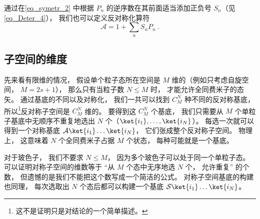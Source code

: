 通过在\autoref{eq_symetr_2} 中根据 $P_n$ 的逆序数在其前面适当添加正负号 $S_n$（见\autoref{eq_Deter_4}）， 我们也可以定义反对称化算符
\begin{equation}
\mathcal A = 1 + \sum_n S_n P_n~.
\end{equation}

\subsection{子空间的维度}
先来看有限维的情况， 假设单个粒子态所在空间是 $M$ 维的（例如只考虑自旋空间， $M = 2s+1$）， 那么只有当粒子数 $N \le M$ 时， 才能允许全同费米子的态矢。 通过基底的不同以及对称化， 我们一共可以找到 $C_M^N$ 种不同的反对称基底， 所以\footnote{这不是证明只是对结论的一个简单描述。}反对称子空间是 $C_M^N$ 维的。 要得到这 $C_M^N$ 个基底， 我们只需要从 $M$ 个单粒子基底中无顺序不重复地选出 $N$ 个（$\ket{i_1}, \dots, \ket{i_N}$）。 每选一次就可以得到一个对称基底 $\mathcal A \ket{i_1}\dots\ket{i_N}$， 它们张成整个反对称子空间。 物理上， 这意味着 $N$ 个全同费米子占据 $M$ 个状态， 每种可能就是一个基底。

对于玻色子， 我们不要求 $N \le M$， 因为多个玻色子可以处于同一个单粒子态。 可以证明对称子空间的维数等于 “从 $M$ 个态中无序地选 $N$ 个， 允许重复” 的个数， 但遗憾的是我们不能把这个数写成一个简洁的公式。 对称子空间基底的构建也同理， 每次选取出 $N$ 个态后都可以构建一个基底 $\mathcal S \ket{i_1}\dots\ket{i_N}$。
